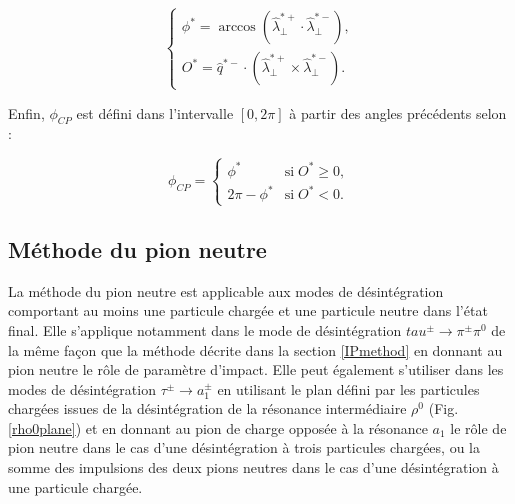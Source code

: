 \begin{equation}
    \left\{
    \begin{array}{ll}
        \phi^*=\arccos(\hat{\lambda}^{*+}_{\perp}\cdot \hat{\lambda}^{*-}_{\perp}), \\
        O^*=\hat{q}^{*-}\cdot(\hat{\lambda}^{*+}_{\perp}\times\hat{\lambda}^{*-}_{\perp}).
    \end{array}
    \right.
    \label{phistar}
\end{equation} 

Enfin, $\phi_{CP}$ est défini dans l'intervalle $[0,2\pi]$ à partir des angles précédents selon :

\begin{equation}
\phi_{CP}=
    \left\{
    \begin{array}{ll}
        \phi^* & \mbox{si} \; O^*\geq0, \\
        2\pi - \phi^* & \mbox{si} \; O^*<0.
    \end{array}
    \right.
    \label{phicp}
\end{equation} 

\subsection{Méthode du pion neutre}

La méthode du pion neutre est applicable aux modes de désintégration comportant au moins une particule chargée et une particule neutre dans l'état final. Elle s'applique notamment dans le mode de désintégration $tau^{\pm}\rightarrow\pi^{\pm}\pi^0$ de la même façon que la méthode décrite dans la section \ref{IPmethod} en donnant au pion neutre le rôle de paramètre d'impact. Elle peut également s'utiliser dans les modes de désintégration $\tau^{\pm}\rightarrow a_1^{\pm}$ en utilisant le plan défini par les particules chargées issues de la désintégration de la résonance intermédiaire $\rho^0$ (Fig. \ref{rho0plane}) et en donnant au pion de charge opposée à la résonance $a_1$ le rôle de pion neutre dans le cas d'une désintégration à trois particules chargées, ou la somme des impulsions des deux pions neutres dans le cas d'une désintégration à une particule chargée. \\

